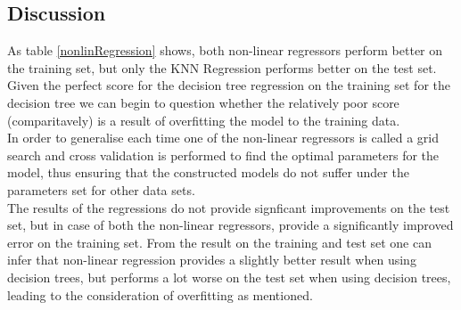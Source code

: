 \subsection{Discussion}
As table \ref{nonlinRegression} shows, both non-linear regressors perform better on the training set, but only the KNN Regression performs better on the test set.\\
Given the perfect score for the decision tree regression on the training set for the decision tree we can begin to question whether the relatively poor score (comparitavely) is a result of overfitting the model to the training data.\\

In order to generalise each time one of the non-linear regressors is called a grid search and cross validation is performed to find the optimal parameters for the model, thus ensuring that the constructed models do not suffer under the parameters set for other data sets.\\

The results of the regressions do not provide signficant improvements on the test set, but in case of both the non-linear regressors, provide a significantly improved error on the training set. From the result on the training and test set one can infer that non-linear regression provides a slightly better result when using decision trees, but performs a lot worse on the test set when using decision trees, leading to the consideration of overfitting as mentioned.
